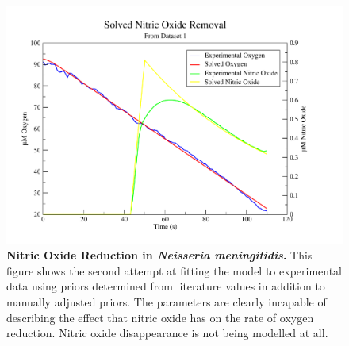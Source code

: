 \begin{figure}[tbp]
 \centering
 \includegraphics[width=15cm, trim=1cm 1cm 3cm 1cm, clip=true]{./06-noreduction/data/aer-no-sim1-2.pdf}
 \caption[{Nitric Oxide Reduction in \textit{Neisseria meningitidis}.}]{{\bf Nitric Oxide Reduction in \textit{Neisseria meningitidis}.} This figure shows the second attempt at fitting the model to experimental data using priors determined from literature values in addition to manually adjusted priors. The parameters are clearly incapable of describing the effect that nitric oxide has on the rate of oxygen reduction. Nitric oxide disappearance is not being modelled at all.}
 \label{fig:nosim1.2}
\end{figure}

